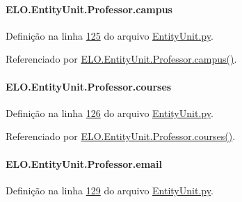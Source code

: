 \paragraph[{campus}]{\setlength{\rightskip}{0pt plus 5cm}E\+L\+O.\+Entity\+Unit.\+Professor.\+campus}\label{classELO_1_1EntityUnit_1_1Professor_ad95cfc8959dcb02a6afff422703d4dde}


Definição na linha \hyperlink{EntityUnit_8py_source_l00125}{125} do arquivo \hyperlink{EntityUnit_8py_source}{Entity\+Unit.\+py}.



Referenciado por \hyperlink{classELO_1_1EntityUnit_1_1Professor_ab460e53bc057c0a793757ade5c83c45b}{E\+L\+O.\+Entity\+Unit.\+Professor.\+campus()}.

\hypertarget{classELO_1_1EntityUnit_1_1Professor_a6eb0d2789bb8750fb275aca0f8bb74bb}{}
\paragraph[{courses}]{\setlength{\rightskip}{0pt plus 5cm}E\+L\+O.\+Entity\+Unit.\+Professor.\+courses}\label{classELO_1_1EntityUnit_1_1Professor_a6eb0d2789bb8750fb275aca0f8bb74bb}


Definição na linha \hyperlink{EntityUnit_8py_source_l00126}{126} do arquivo \hyperlink{EntityUnit_8py_source}{Entity\+Unit.\+py}.



Referenciado por \hyperlink{classELO_1_1EntityUnit_1_1Professor_aa1835a6fafa70e65407f20c14797c40e}{E\+L\+O.\+Entity\+Unit.\+Professor.\+courses()}.

\hypertarget{classELO_1_1EntityUnit_1_1Professor_a7c6f76f185515050334dc74a030043a7}{}
\paragraph[{email}]{\setlength{\rightskip}{0pt plus 5cm}E\+L\+O.\+Entity\+Unit.\+Professor.\+email}\label{classELO_1_1EntityUnit_1_1Professor_a7c6f76f185515050334dc74a030043a7}


Definição na linha \hyperlink{EntityUnit_8py_source_l00129}{129} do arquivo \hyperlink{EntityUnit_8py_source}{Entity\+Unit.\+py}.



